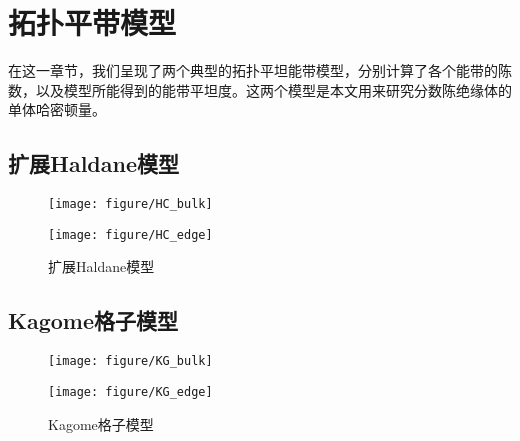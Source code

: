 \chapter{拓扑平带模型}
\label{models}
在这一章节，我们呈现了两个典型的拓扑平坦能带模型，分别计算了各个能带的陈数，以及模型所能得到的能带平坦度。这两个模型是本文用来研究分数陈绝缘体的单体哈密顿量。

\section{扩展Haldane模型}



\begin{figure}[ht]
  \begin{minipage}[c]{0.5\textwidth}
  \texttt{[image: figure/HC\_bulk]}
  \hspace{5in}
  \end{minipage}
  \begin{minipage}[c]{0.5\textwidth}
  \texttt{[image: figure/HC\_edge]}
  \end{minipage}
\caption{扩展Haldane模型}
\label{fig:TFB_HC}
\end{figure}


\section{Kagome格子模型}

\begin{figure}[ht]
  \begin{minipage}[c]{0.5\textwidth}
  \texttt{[image: figure/KG\_bulk]}
  \hspace{5in}
  \end{minipage}
  \begin{minipage}[c]{0.5\textwidth}
  \texttt{[image: figure/KG\_edge]}
  \end{minipage}
\caption{Kagome格子模型}
\label{fig:TFB_KG}
\end{figure}
